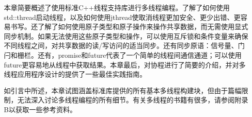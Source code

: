 本章简要概述了使用标准C++线程支持库进行多线程编程。了解了如何使用std::thread启动线程，以及如何使用jthread使取消线程更加安全、更少出错、更容易书写。还了解了如何使用原子类型和原子操作来操作共享数据，而无需使用显式同步机制。如果无法使用这些原子类型和操作，可以使用互斥锁和条件变量来确保不同线程之间，对共享数据的读/写访问的适当同步。还有同步原语：信号量、门闩和栅栏。还有，promise和future代表了一个简单的线程间通信通道；可以使用future更容易地从线程中获取结果。本章最后，对协程进行了简要的介绍，并对多线程应用程序设计的提供了一些最佳实践指南。

如引言中所述，本章试图涵盖标准库提供的所有基本多线程构建块，但由于篇幅限制，无法深入讨论多线程编程的所有细节。有关多线程的书籍有很多，请参阅附录B以获取一些参考资料。
